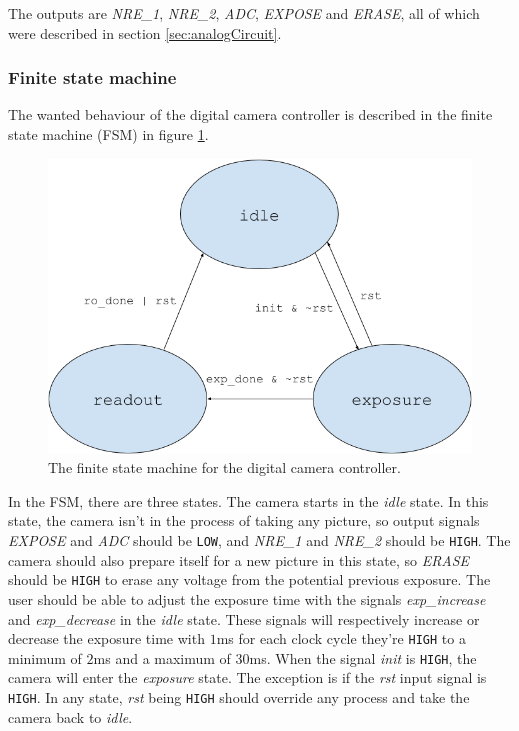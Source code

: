 The outputs are \emph{NRE\_1}, \emph{NRE\_2}, \emph{ADC}, \emph{EXPOSE} and \emph{ERASE}, all of which were described in section \ref{sec:analogCircuit}.

\subsubsection{Finite state machine}
\label{sec:fsm}
The wanted behaviour of the digital camera controller is described in the finite state machine (FSM) in figure \ref{fig:fsm}.

\begin{figure}[H]
    \centering
    \includegraphics[width=\textwidth]{graphs/fsm.png}
    \caption{The finite state machine for the digital camera controller.}
    \label{fig:fsm}
\end{figure}

In the FSM, there are three states. The camera starts in the \emph{idle} state. In this state, the camera isn't in the process of taking any picture, so output signals \emph{EXPOSE} and \emph{ADC} should be \verb|LOW|, and \emph{NRE\_1} and \emph{NRE\_2} should be \verb|HIGH|. The camera should also prepare itself for a new picture in this state, so \emph{ERASE} should be \verb|HIGH| to erase any voltage from the potential previous exposure. The user should be able to adjust the exposure time with the signals \emph{exp\_increase} and \emph{exp\_decrease} in the \emph{idle} state. These signals will respectively increase or decrease the exposure time with $1$ms for each clock cycle they're \verb|HIGH| to a minimum of $2$ms and a maximum of $30$ms. When the signal \emph{init} is \verb|HIGH|, the camera will enter the \emph{exposure} state. The exception is if the \emph{rst} input signal is \verb|HIGH|. In any state, \emph{rst} being \verb|HIGH| should override any process and take the camera back to \emph{idle}.


